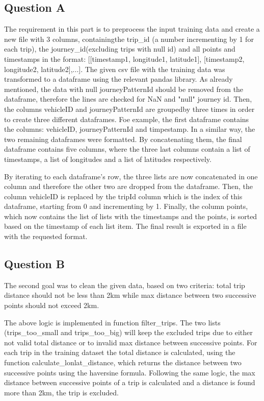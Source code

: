 \documentclass[12pt]{article}
\begin{document}
	\subsection{Question A}
	The requirement in this part is to preprocess the input training data and create a new file with 3 columns, containingthe trip\_id (a number incrementing by 1 for each trip), the journey\_id(excluding trips with null id) and all points and timestamps in the format: [[timestamp1, longitude1, latitude1], [timestamp2, longitude2, latitude2],...]. The given csv file with the training data was transformed to a dataframe using the relevant pandas library. As already mentioned, the data with null journeyPatternId should be removed from the dataframe, therefore the lines are checked for NaN and "null" journey id. Then, the columns vehicleID and journeyPatternId are groupedby three times in order to create three different dataframes. Foe example, the first dataframe contains the columns: vehicleID, journeyPatternId and timpestamp. In a similar way, the two remaining dataframes were formatted. By concatenating them, the final dataframe contains five columns, where the three last columns contain a list of timestamps, a list of longitudes and a list of latitudes respectively.
	
	By iterating to each dataframe's row, the three lists are now concatenated in one column and therefore the other two are dropped from the dataframe. Then, the column vehicleID is replaced by the tripId column which is the index of this dataframe, starting from 0 and incrementing by 1. Finally, the column points, which now contains the list of lists with the timestamps and the points, is sorted based on the timestamp of each list item. The final result is exported in a file with the requested format.
	
	\subsection{Question B}
	The second goal was to clean the given data, based on two criteria: total trip distance should not be less than 2km while max distance between two successive points should not exceed 2km.
	
	The above logic is implemented in function filter\_trips. The two lists (trips\_too\_small and trips\_too\_big) will keep the excluded trips due to either not valid total distance or to invalid max distance between successive points. For each trip in the training dataset the total distance is calculated, using the function calculate\_lonlat\_distance, which returns the distance between two successive points using the haversine formula. Following the same logic, the max distance between successive points of a trip is calculated and a distance is found more than 2km, the trip is excluded.
	
\end{document}
